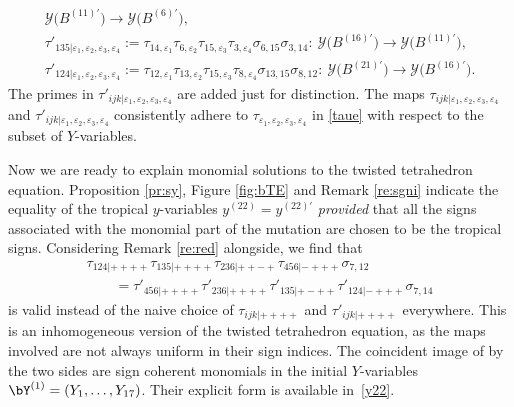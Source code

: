 \begin{gather*}
 \mathcal{Y}\bigl(B^{(11)\prime}\bigr) \rightarrow \mathcal{Y}\bigl(B^{(6)\prime}\bigr),
\\
\tau'_{135 | \varepsilon_1,\varepsilon_2,\varepsilon_3,\varepsilon_4} :=
\tau_{14,\varepsilon_1}\tau_{6,\varepsilon_2}\tau_{15,\varepsilon_3}\tau_{3,\varepsilon_4}\sigma_{6,15}\sigma_{3,14}\colon\
 \mathcal{Y}\bigl(B^{(16)\prime}\bigr) \rightarrow \mathcal{Y}\bigl(B^{(11)\prime}\bigr),
\\
\tau'_{124 | \varepsilon_1,\varepsilon_2,\varepsilon_3,\varepsilon_4} :=
\tau_{12,\varepsilon_1}\tau_{13,\varepsilon_2}\tau_{15,\varepsilon_3}\tau_{8,\varepsilon_4}\sigma_{13,15}\sigma_{8,12}\colon\
 \mathcal{Y}\bigl(B^{(21)\prime}\bigr) \rightarrow \mathcal{Y}\bigl(B^{(16)\prime}\bigr).
\end{gather*}
The primes in $\tau'_{\!ijk | \varepsilon_1,\varepsilon_2,\varepsilon_3,\varepsilon_4}$
are added just for distinction.
The maps $\tau_{\!ijk | \varepsilon_1,\varepsilon_2,\varepsilon_3,\varepsilon_4}$ and
$\tau'_{\!ijk | \varepsilon_1,\varepsilon_2,\varepsilon_3,\varepsilon_4}$
consistently adhere to $\tau_{\varepsilon_1,\varepsilon_2,\varepsilon_3,\varepsilon_4}$ in
\eqref{taue} with respect to the subset of $Y$-variables.

Now we are ready to explain monomial solutions to the twisted tetrahedron equation.
Proposition \ref{pr:sy}, Figure \ref{fig:bTE} and Remark \ref{re:sgni} indicate
the equality of the tropical $y$-variables $y^{(22)} = y^{(22)\prime}$ {\em provided} that
all the signs associated with the monomial part of the mutation are chosen to be the tropical signs.
Considering Remark \ref{re:red} alongside, we find that
\begin{gather}
\tau_{124| + + + +} \tau_{135| + + + +}\tau_{236| + + - +}\tau_{456| - + + +}\sigma_{7,12}\nonumber\\
\qquad
=
\tau'_{456| + + + +}\tau'_{236| + + + +}\tau'_{135| + - + +}\tau'_{124| - + + +}\sigma_{7,14}\label{ihte}
\end{gather}
is valid instead of the naive choice of $\tau_{ijk| ++++}$ and $\tau'_{ijk| ++++}$ everywhere.
This is an inhomogeneous version of the twisted tetrahedron equation,
as the maps involved are not always uniform in their sign indices.
%
The coincident image of \smash{$Y^{(22)}_1, \dots, Y^{(22)}_{17}$} by the
two sides are sign coherent monomials in the initial $Y$-variables
$\bY^{(1)} = (Y_1,\dotsc, Y_{17})$. Their explicit form is available
in~\eqref{y22}.

